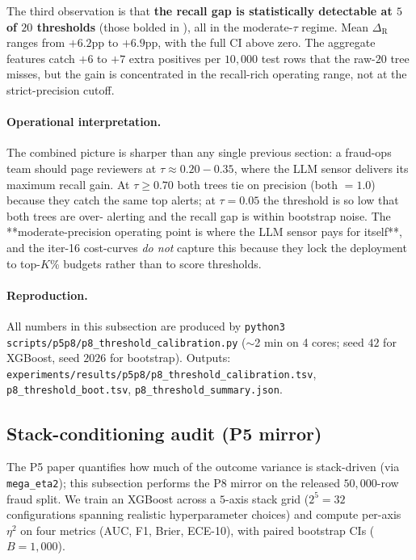 The third observation is that \textbf{the recall gap is statistically
detectable at $5$ of $20$ thresholds} (those bolded in
), all in the
moderate-$\tau$ regime. Mean $\Delta_\text{R}$ ranges from $+6.2$pp
to $+6.9$pp, with the full CI above zero. The aggregate features
catch $+6$ to $+7$ extra positives per $10{,}000$ test rows that the
raw-$20$ tree misses, but the gain is concentrated in the recall-rich
operating range, not at the strict-precision cutoff.

\paragraph{Operational interpretation.} The combined picture is
sharper than any single previous section: a fraud-ops team should
page reviewers at $\tau \approx 0.20{-}0.35$, where the LLM sensor
delivers its maximum recall gain. At $\tau \ge 0.70$ both trees tie
on precision (both $= 1.0$) because they catch the same top alerts;
at $\tau = 0.05$ the threshold is so low that both trees are over-
alerting and the recall gap is within bootstrap noise. The
**moderate-precision operating point is where the LLM sensor pays for
itself**, and the iter-16 cost-curves \emph{do not} capture this
because they lock the deployment to top-$K$\% budgets rather than to
score thresholds.

\paragraph{Reproduction.} All numbers in this subsection are produced
by \texttt{python3 scripts/p5p8/p8\_threshold\_calibration.py}
($\sim$2 min on 4 cores; seed $42$ for XGBoost, seed $2026$ for
bootstrap). Outputs:
\texttt{experiments/results/p5p8/p8\_threshold\_calibration.tsv},
\texttt{p8\_threshold\_boot.tsv},
\texttt{p8\_threshold\_summary.json}.

\subsection{Stack-conditioning audit (P5 mirror)}

The P5 paper quantifies how much of the outcome variance is stack-driven
(via \texttt{mega\_eta2}); this subsection performs the P8 mirror on the
released $50{,}000$-row fraud split. We train an XGBoost across a
$5$-axis stack grid ($2^5 = 32$ configurations spanning realistic
hyperparameter choices) and compute per-axis $\eta^2$ on four metrics
(AUC, F1, Brier, ECE-10), with paired bootstrap CIs ($B{=}1{,}000$).

